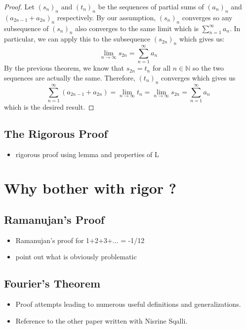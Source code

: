\documentclass[10pt]{article}
\newcommand{\N}{\mathbb{N}}
\theoremstyle{definition}
\begin{document}
\begin{proof}
    Let $(s_n)_n$ and $(t_n)_n$ be the sequences of partial sums of $(a_n)_n$ and $(a_{2n-1} + a_{2n})_n$ respectively. By our assumption, $(s_n)_n$ converges so any subsequence of $(s_n)_n$ also converges to the same limit which is $\sum_{n=1}^{\infty}a_n$. In particular, we can apply this to the subsequence $(s_{2n})_n$ which gives us:
    $$\lim_{n \rightarrow \infty}s_{2n} = \sum_{n=1}^{\infty}a_n$$ 
    By the previous theorem, we know that $s_{2n} = t_n$ for all $n \in \N$ so the two sequences are actually the same. Therefore, $(t_n)_n$ converges which gives us
    $$\sum_{n=1}^{\infty}(a_{2n-1} + a_{2n}) = \lim_{n \rightarrow \infty}t_n = \lim_{n \rightarrow \infty}s_{2n} = \sum_{n=1}^{\infty}a_n$$
    which is the desired result.
\end{proof}

\subsection{The Rigorous Proof}

\begin{itemize}
    \item rigorous proof using lemma and properties of L
\end{itemize}

\section{Why bother with rigor ?}

\subsection{Ramanujan's Proof}

\begin{itemize}
    \item Ramanujan's proof for 1+2+3+... = -1/12
    \item point out what is obviously problematic
\end{itemize}

\subsection{Fourier's Theorem}

\begin{itemize}
    \item Proof attempts leading to numerous useful definitions and generalizations.
    \item Reference to the other paper written with Nisrine Sqalli.
\end{itemize}
\end{document}
